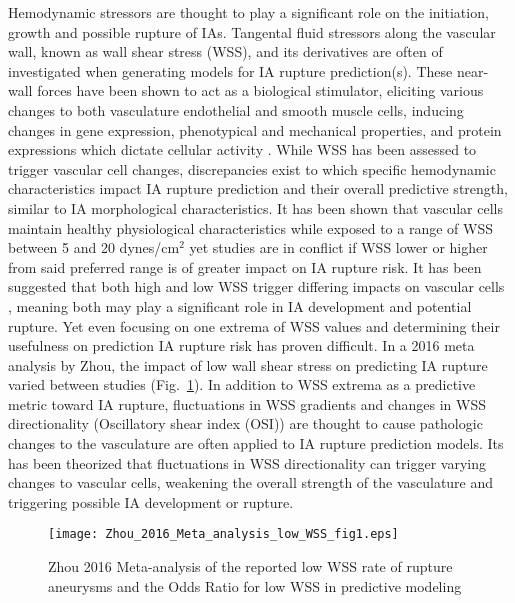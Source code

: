 Hemodynamic stressors are thought to play a significant role on the initiation, growth and possible rupture of IAs. Tangental fluid stressors along the vascular wall, known as wall shear stress (WSS), and its derivatives are often of investigated when generating models for IA rupture prediction(s)\cite{Jing2015,Xiang2011WSS,doddasomayajula2017hemodynamic,Cebral510}. These near-wall forces have been shown to act as a biological stimulator, eliciting various changes to both vasculature endothelial and smooth muscle cells, inducing changes in gene expression, phenotypical and mechanical properties, and protein expressions which dictate cellular activity \cite{baek2009flow,van2010analyzing,dolan2013high,sato2000local,baeyens2016endothelial,byrne2014quantifying,cecchi2011role,kulcsar2011hemodynamics}. While WSS has been assessed to trigger vascular cell changes, discrepancies exist to which specific hemodynamic characteristics impact IA rupture prediction and their overall predictive strength, similar to IA morphological characteristics. It has been shown that vascular cells maintain healthy physiological characteristics while exposed to a range of WSS between 5 and 20 dynes/cm$^{2}$ yet studies are in conflict if WSS lower \cite{Miura519,boussel2008aneurysm} or higher \cite{dolan2013high,shojima2004magnitude} from said preferred range is of greater impact on IA rupture risk. It has been suggested that both high and low WSS trigger differing impacts on vascular cells \cite{Meng1254}, meaning both may play a significant role in IA development and potential rupture. Yet even focusing on one extrema of WSS values and determining their usefulness on prediction IA rupture risk has proven difficult. In a 2016 meta analysis by Zhou, the impact of low wall shear stress on predicting IA rupture varied between studies (Fig.~\ref{Low_WSS_meta_analysis}). In addition to WSS extrema as a predictive metric toward IA rupture, fluctuations in WSS gradients and changes in WSS directionality (Oscillatory shear index (OSI)) are thought to cause pathologic changes to the vasculature are often applied to IA rupture prediction models. Its has been theorized that fluctuations in WSS directionality can trigger varying changes to vascular cells, weakening the overall strength of the vasculature and triggering possible IA development or rupture. 
  
\begin{figure}[!h]
\begin{center}
\texttt{[image: Zhou\_2016\_Meta\_analysis\_low\_WSS\_fig1.eps]}
\captionsetup{width=0.5\textwidth, justification=justified,singlelinecheck=false}
\caption{Zhou 2016 Meta-analysis of the reported low WSS rate of rupture aneurysms and the Odds Ratio for low WSS in predictive modeling}
\end{center}
\label{Low_WSS_meta_analysis}
\end{figure}

